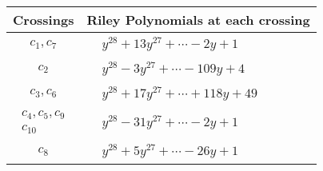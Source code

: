\documentclass[1p]{elsarticle_modified}
\theoremstyle{definition}
\begin{document}
\begin{tabular}{m{50pt}|m{274pt}}
Crossings & \hspace{64pt}Riley Polynomials at each crossing \\
\hline $$\begin{aligned}c_{1},c_{7}\end{aligned}$$&$\begin{aligned}
&y^{28}+13 y^{27}+\cdots-2 y+1
\end{aligned}$\\
\hline $$\begin{aligned}c_{2}\end{aligned}$$&$\begin{aligned}
&y^{28}-3 y^{27}+\cdots-109 y+4
\end{aligned}$\\
\hline $$\begin{aligned}c_{3},c_{6}\end{aligned}$$&$\begin{aligned}
&y^{28}+17 y^{27}+\cdots+118 y+49
\end{aligned}$\\
\hline $$\begin{aligned}c_{4},c_{5},c_{9}\\c_{10}\end{aligned}$$&$\begin{aligned}
&y^{28}-31 y^{27}+\cdots-2 y+1
\end{aligned}$\\
\hline $$\begin{aligned}c_{8}\end{aligned}$$&$\begin{aligned}
&y^{28}+5 y^{27}+\cdots-26 y+1
\end{aligned}$\\
\hline
\end{tabular}
\vskip 2pc
\end{document}
